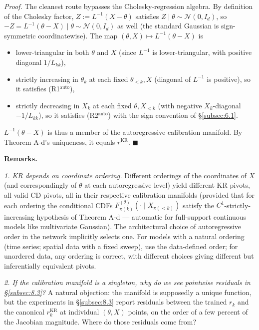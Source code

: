 \documentclass[11pt]{article}
\providecommand{\tightlist}{\setlength{\itemsep}{0pt}\setlength{\parskip}{0pt}}
\begin{document}
\emph{Proof.} The cleanest route bypasses the Cholesky-regression
algebra. By definition of the Cholesky factor, \(Z := L^{-1}(X - \theta)\)
satisfies \(Z \mid \theta \sim \mathcal{N}(0, I_d)\), so
\(-Z = L^{-1}(\theta - X) \mid \theta \sim \mathcal{N}(0, I_d)\) as well
(the standard Gaussian is sign-symmetric coordinatewise). The map
\((\theta, X) \mapsto L^{-1}(\theta - X)\) is
\begin{itemize}
\tightlist
\item lower-triangular in both \(\theta\) and \(X\) (since \(L^{-1}\) is
  lower-triangular, with positive diagonal \(1/L_{kk}\)),
\item strictly increasing in \(\theta_k\) at each fixed
  \(\theta_{<k}, X\) (diagonal of \(L^{-1}\) is positive), so it
  satisfies (R1\(^\mathrm{auto}\)),
\item strictly decreasing in \(X_k\) at each fixed \(\theta, X_{<k}\)
  (with negative \(X_k\)-diagonal \(-1/L_{kk}\)), so it satisfies
  (R2\(^\mathrm{auto}\)) with the sign convention of \S\ref{subsec:6.1}.
\end{itemize}
\(L^{-1}(\theta - X)\) is thus a member of the autoregressive
calibration manifold. By Theorem A-d's uniqueness, it equals
\(r^{\mathrm{KR}}\). \(\blacksquare\)

\textbf{Remarks.}

\emph{1. KR depends on coordinate ordering.} Different orderings of the
coordinates of \(X\) (and correspondingly of \(\theta\) at each
autoregressive level) yield different KR pivots, all valid CD pivots,
all in their respective calibration manifolds (provided that for each
ordering the conditional CDFs \(F_{\pi(k)}^{(\theta)}(\cdot \mid X_{\pi(<k)})\)
satisfy the \(C^1\)-strictly-increasing hypothesis of Theorem A-d ---
automatic for full-support continuous models like multivariate Gaussian).
The architectural choice of autoregressive order in the network
implicitly selects one. For models with a natural ordering (time series;
spatial data with a fixed sweep), use the data-defined order; for
unordered data, any ordering is correct, with different choices giving
different but inferentially equivalent pivots.

\emph{2. If the calibration manifold is a singleton, why do we see
pointwise residuals in §\ref{subsec:8.3}?} A natural objection: the
manifold is supposedly a unique function, but the experiments in
\S\ref{subsec:8.3} report residuals between the trained \(r_k\) and the
canonical \(r_k^{\mathrm{KR}}\) at individual \((\theta, X)\) points,
on the order of a few percent of the Jacobian magnitude. Where do those
residuals come from?
\end{document}
